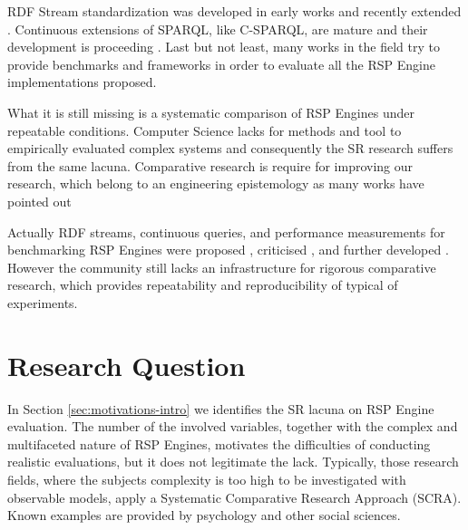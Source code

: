 RDF Stream standardization was developed in early works \cite{DBLP:journals/expert/ValleCHF09, Lephuoc2011} and recently extended \cite{DBLP:conf/semweb/BalduiniVDTPC13}. Continuous extensions of SPARQL, like C-SPARQL, are mature and their development is proceeding \cite{Barbieri2010}. Last but not least, many works in the field  \cite{Zhang2012,LePhuoc2012c}  try to provide benchmarks and frameworks in order to evaluate all the RSP Engine implementations proposed. 

What it is still missing is a systematic comparison of RSP Engines under repeatable conditions. Computer Science lacks for methods and tool to empirically evaluated complex systems \cite{Perry:2000:ESS:336512.336586} and consequently the SR research suffers from the same lacuna. Comparative research is require for improving our research, which belong to an engineering epistemology as many works have pointed out \cite{Tichy:1995:EEC:209090.209093,Wainer:2009:EEC:1518331.1518552}

Actually RDF streams, continuous queries, and performance measurements for benchmarking RSP Engines were proposed \cite{LePhuoc2012c,Zhang2012}, criticised \cite{DBLP:conf/esws/ScharrenbachUMVB13}, and further developed \cite{DBLP:conf/semweb/DellAglioCBCV13}. However the community still lacks an infrastructure for rigorous comparative research, which provides repeatability and reproducibility of typical of experiments.


\section{Research Question}\label{sec:research-question-intro}

In Section \ref{sec:motivations-intro} we identifies the SR lacuna on RSP Engine evaluation. The number of the involved variables, together with the complex and multifaceted nature of RSP Engines, motivates the difficulties of conducting realistic evaluations, but it does not legitimate the lack. Typically, those research fields, where the subjects complexity is too high to be investigated with observable models, apply a Systematic Comparative Research Approach (SCRA). Known examples are provided by psychology and other social sciences.

